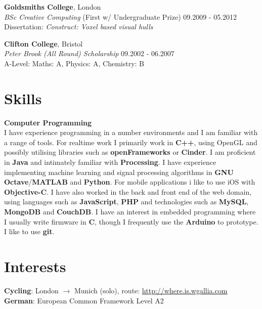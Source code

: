 \documentclass[margin,line,a4paper]{resume}
\begin{document}
\begin{resume}
\textbf{Goldsmiths College}, London \vspace{0.5mm}\\
\textsl{BSc Creative Computing} (First w/ Undergraduate Prize) \hfill 09.2009 - 05.2012 \vspace{2mm} \\
Dissertation: \emph{Construct: Voxel based visual hulls}

\textbf{Clifton College}, Bristol \vspace{0.5mm}\\
\textsl{Peter Brook (All Round) Scholarship} \hfill 09.2002 - 06.2007 \vspace{2mm} \\
A-Level: Maths: A, Physics: A, Chemistry: B \\

\newpage
\section{\mysidestyle Skills}

\textbf{Computer Programming} \vspace{1mm} \\
I have experience programming in a number environments and I am
familiar with a range of tools. For realtime work I primarily work in
\textbf{C++}, using OpenGL and possibly utilising
libraries such as \textbf{openFrameworks} or \textbf{Cinder}. I am
proficient in \textbf{Java} and intimately familiar with
\textbf{Processing}. I have experience implementing machine learning
and signal processing algorithms in \textbf{GNU
  Octave}/\textbf{MATLAB} and \textbf{Python}. For mobile applications
i like to use iOS with \textbf{Objective-C}. I have also worked in the
back and front end of the web domain, using languages such as
\textbf{JavaScript}, \textbf{PHP} and technologies such as
\textbf{MySQL}, \textbf{MongoDB} and \textbf{CouchDB}. I have an interest in embedded
programming where I usually write firmware in \textbf{C}, though I
frequently use the \textbf{Arduino} to prototype. I like to use
\textbf{git}.

\section{\mysidestyle Interests}

\textbf{Cycling}: London $\rightarrow$ Munich (solo), route: \href{http://where.is.wgallia.com}{http://where.is.wgallia.com} \vspace{1mm} \\
\textbf{German}: European Common Framework Level A2


\end{resume}
\end{document}

